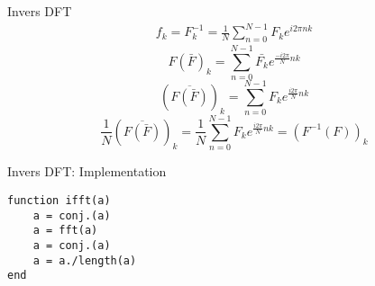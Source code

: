 \documentclass[presentation]{beamer}
\begin{document}
\begin{frame}[label={sec:org468339d}]{Invers DFT}
\begin{align*}
f_{k} = F_{k}^{-1} = \frac{1}{N}\sum_{n=0}^{N-1}F_{k}e^{i2 \pi nk}
\end{align*}
\pause
\begin{equation*}
  F(\bar{F})_{k} = \sum_{n=0}^{N-1}\bar{F_{k}}e^{\frac{-i2 \pi}{N}nk}
\end{equation*}
\pause
\begin{equation*}
  (\overline{F(\bar{F})})_{k} = \sum_{n=0}^{N-1}F_{k}e^{\frac{i2 \pi}{N}nk}
\end{equation*}
\pause
\begin{equation*}
    \frac{1}{N}(\overline{F(\bar{F})})_{k} =
  \frac{1}{N}\sum_{n=0}^{N-1}F_{k}e^{\frac{i2 \pi}{N}nk} = (F^{-1}(F))_{k}
\end{equation*}

\newpage
\end{frame}

\begin{frame}[label={sec:org617bb55},fragile]{Invers DFT: Implementation}
 \begin{verbatim}
function ifft(a)
    a = conj.(a)
    a = fft(a)
    a = conj.(a)
    a = a./length(a)
end
\end{verbatim}
\end{frame}
\end{document}
